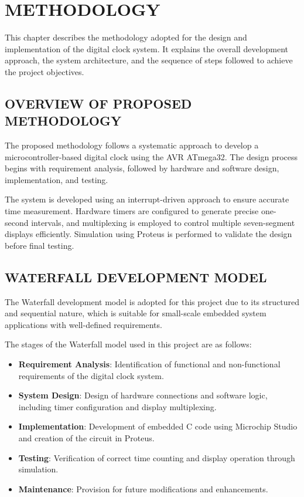 \chapter{METHODOLOGY}%
\label{chap:methodology}

This chapter describes the methodology adopted for the design and implementation of the 
digital clock system. It explains the overall development approach, the system architecture, 
and the sequence of steps followed to achieve the project objectives.

\section{OVERVIEW OF PROPOSED METHODOLOGY}

The proposed methodology follows a systematic approach to develop a microcontroller-based 
digital clock using the AVR ATmega32. The design process begins with requirement analysis, 
followed by hardware and software design, implementation, and testing.

The system is developed using an interrupt-driven approach to ensure accurate time measurement. 
Hardware timers are configured to generate precise one-second intervals, and multiplexing is 
employed to control multiple seven-segment displays efficiently. Simulation using Proteus is 
performed to validate the design before final testing.

\section{WATERFALL DEVELOPMENT MODEL}

The Waterfall development model is adopted for this project due to its structured and 
sequential nature, which is suitable for small-scale embedded system applications with 
well-defined requirements.

The stages of the Waterfall model used in this project are as follows:
\begin{itemize}
    \item \textbf{Requirement Analysis}: Identification of functional and non-functional requirements of the digital clock system.
    \item \textbf{System Design}: Design of hardware connections and software logic, including timer configuration and display multiplexing.
    \item \textbf{Implementation}: Development of embedded C code using Microchip Studio and creation of the circuit in Proteus.
    \item \textbf{Testing}: Verification of correct time counting and display operation through simulation.
    \item \textbf{Maintenance}: Provision for future modifications and enhancements.
\end{itemize}
\enumitemEndSpacing{}

